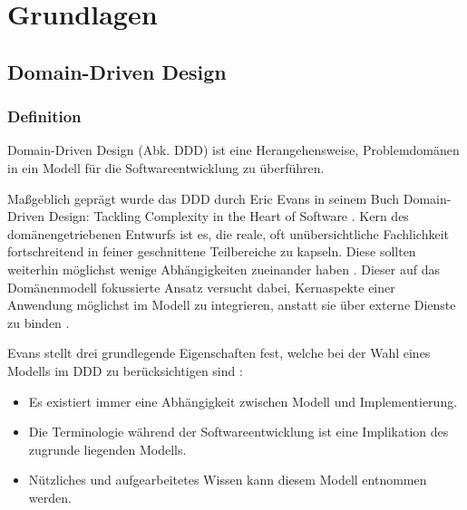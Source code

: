 \chapter{Grundlagen}

%
%

\section{Domain-Driven Design}

\subsection{Definition}

\glqq Domain-Driven Design\grqq{} (Abk. DDD) ist eine Herangehensweise, Problemdomänen in ein Modell für die Softwareentwicklung zu überführen.

Maßgeblich geprägt wurde das DDD durch Eric Evans in seinem Buch \glqq Domain-Driven Design: Tackling Complexity in the Heart of Software\grqq{} \cite{evans}. Kern des domänengetriebenen Entwurfs ist es, die reale, oft unübersichtliche Fachlichkeit fortschreitend in feiner geschnittene Teilbereiche zu kapseln. Diese sollten weiterhin möglichst wenige Abhängigkeiten zueinander haben \cite[S.63, 70]{dowalil}. Dieser auf das Domänenmodell fokussierte Ansatz versucht dabei, Kernaspekte einer Anwendung möglichst im Modell zu integrieren, anstatt sie über externe Dienste zu binden \cite[S.74]{daschner}.

Evans stellt drei grundlegende Eigenschaften fest, welche bei der Wahl eines Modells im DDD zu berücksichtigen sind \cite[S. 3-4]{evans}:
\begin{itemize}
\item Es existiert immer eine Abhängigkeit zwischen Modell und Implementierung.
\item Die Terminologie während der Softwareentwicklung ist eine Implikation des zugrunde liegenden Modells.
\item Nützliches und aufgearbeitetes Wissen kann diesem Modell entnommen werden.
\end{itemize}

